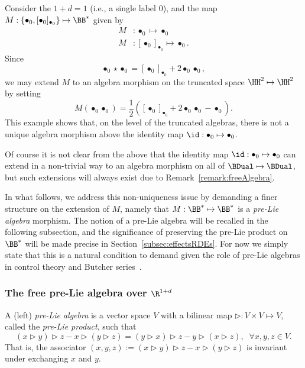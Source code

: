 \documentclass{article}
\begin{document}
\begin{example}
Consider the $1+d = 1$ (i.e., a single label $0$), and the map $M : \{\bullet_0, [\bullet_0]_{\bullet_0}\} \mapsto \BB^*$ given by
\begin{align*}
M &: \bullet_0 \mapsto \bullet_0 \\
M &: [\bullet_0]_{\bullet_0} \mapsto \bullet_0.
\end{align*}
Since
\[
\bullet_0 \star \bullet_0 = [\bullet_0]_{\bullet_0} + 2 \bullet_0 \bullet_0,
\]
we may extend $M$ to an algebra morphism on the truncated space $\HH^2 \mapsto \HH^2$ by setting
\[
M(\bullet_0\bullet_0) = \frac{1}{2}\left( [\bullet_0]_{\bullet_0} + 2\bullet_0\bullet_0 - \bullet_0 \right).
\]
This example shows that, on the level of the truncated algebras, there is not a unique algebra morphism above the identity map $\id : \bullet_0 \mapsto \bullet_0$.

Of course it is not clear from the above that the identity map $\id : \bullet_0 \mapsto \bullet_0$ can extend in a non-trivial way to an algebra morphism on all of $\BDual \mapsto \BDual$, but such extensions will always exist due to Remark~\ref{remark:freeAlgebra}.
\end{example}

In what follows, we address this non-uniqueness issue by demanding a finer structure on the extension of $M$, namely that $M : \BB^* \mapsto \BB^*$ is a \emph{pre-Lie algebra} morphism.
The notion of a pre-Lie algebra will be recalled in the following subsection, and the significance of preserving the pre-Lie product on $\BB^*$ will be made precise in Section~\ref{subsec:effectsRDEs}. For now we simply state that this is a natural condition to demand given the role of pre-Lie algebras in control theory and Butcher series~\cite{Calaque11,Manchon11}. 

\subsubsection{The free pre-Lie algebra over $\R^{1+d}$} \label{subsubsec:PreLie}

\begin{definition}
A (left) \emph{pre-Lie algebra} is a vector space $V$ with a bilinear map $\triangleright : V\times V \mapsto V$, called the \emph{pre-Lie product}, such that
\[
(x \triangleright y)\triangleright z - x\triangleright(y\triangleright z) = (y \triangleright x)\triangleright z - y\triangleright(x \triangleright z), \; \; \forall x,y,z \in V.
\]
That is, the associator $(x,y,z) := (x \triangleright y)\triangleright z - x\triangleright(y\triangleright z)$ is invariant under exchanging $x$ and $y$.
\end{definition}
\end{document}
